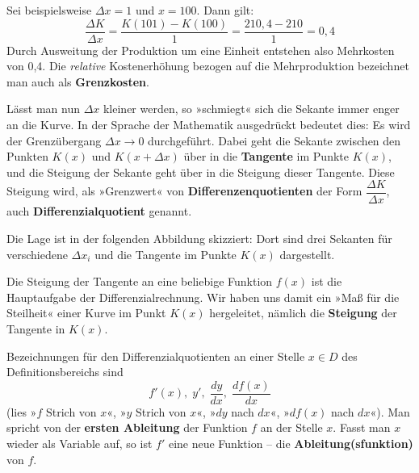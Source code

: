 Sei beispielsweise $\Delta x = 1$ und $x = 100$. Dann gilt:
\[ \frac{\Delta K}{\Delta x} = \frac{K(101) - K(100)}{1} = \frac{210{,}4 - 210}{1} = 0{,}4 \]
Durch Ausweitung der Produktion um eine Einheit entstehen also Mehrkosten von 0,4. Die \emph{relative} Kostenerhöhung bezogen auf die Mehrproduktion bezeichnet man auch als \textbf{Grenzkosten}.

Lässt man nun $\Delta x$ kleiner werden, so »schmiegt« sich die Sekante immer enger an die Kurve. In der Sprache der Mathematik ausgedrückt bedeutet dies: Es wird der Grenzübergang $\Delta x \rightarrow 0$ durchgeführt. Dabei geht die Sekante zwischen den Punkten $K(x)$ und $K(x + \Delta x)$ über in die \textbf{Tangente} im Punkte $K(x)$, und die Steigung der Sekante geht über in die Steigung dieser Tangente. Diese Steigung wird, als »Grenzwert« von \textbf{Differenzenquotienten} der Form $\dfrac{\Delta K}{\Delta x}$, auch \textbf{Differenzialquotient} genannt.

Die Lage ist in der folgenden Abbildung skizziert: Dort sind drei Sekanten für verschiedene $\Delta x_i$ und die Tangente im Punkte $K(x)$ dargestellt.

\begin{center}
\end{center}

Die Steigung der Tangente an eine beliebige Funktion $f(x)$ ist die Hauptaufgabe der Differenzialrechnung. Wir haben uns damit ein »Maß für die Steilheit« einer Kurve im Punkt $K(x)$ hergeleitet, nämlich die \textbf{Steigung} der Tangente in $K(x)$.

Bezeichnungen für den Differenzialquotienten an einer Stelle $x \in D$ des Definitionsbereichs sind
\[ f'(x), \; y', \; \frac{dy}{dx}, \; \frac{df(x)}{dx} \]
(lies »$f$ Strich von $x$«, »$y$ Strich von $x$«, »$dy$ nach $dx$«, »$df(x)$ nach $dx$«).
Man spricht von der \textbf{ersten Ableitung} der Funktion $f$ an der Stelle $x$. Fasst man $x$ wieder als Variable auf, so ist $f'$ eine neue Funktion -- die \textbf{Ableitung(sfunktion)} von $f$.


